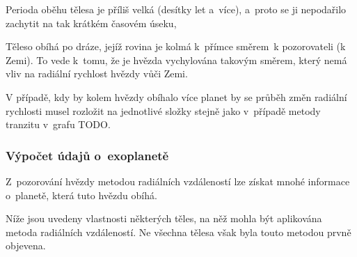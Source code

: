 \documentclass[a4paper,12pt]{article}
\begin{document}
{{\item Perioda oběhu tělesa je příliš velká (desítky let a~více), a~proto se ji nepodařilo zachytit na tak krátkém časovém úseku,

\item Těleso obíhá po dráze, jejíž rovina je kolmá k~přímce směrem~k pozorovateli (k Zemi). To vede k~tomu, že je hvězda vychylována takovým směrem, který nemá vliv na radiální rychlost hvězdy vůči Zemi.
}

V případě, kdy by kolem hvězdy obíhalo více planet by se průběh změn radiální rychlosti musel rozložit na jednotlivé složky stejně jako v~případě metody tranzitu v~grafu TODO.

\subsubsection{Výpočet údajů o~exoplanetě}

Z~pozorování hvězdy metodou radiálních vzdáleností lze získat mnohé informace o~planetě, která tuto hvězdu obíhá.


Níže jsou uvedeny vlastnosti některých těles, na něž mohla být aplikována metoda radiálních vzdáleností. Ne všechna tělesa však byla touto metodou prvně objevena.

}
\end{document}
